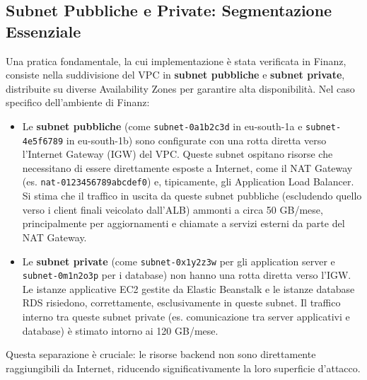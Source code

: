 \subsection{Subnet Pubbliche e Private: Segmentazione Essenziale}
\label{subsec:subnets_cap2}
Una pratica fondamentale, la cui implementazione è stata verificata in Finanz, consiste nella suddivisione del VPC in \textbf{subnet pubbliche} e \textbf{subnet private}, distribuite su diverse Availability Zones per garantire alta disponibilità. Nel caso specifico dell'ambiente di Finanz:
\begin{itemize}
\item Le \textbf{subnet pubbliche} (come \texttt{subnet-0a1b2c3d} in eu-south-1a e \texttt{subnet-4e5f6789} in eu-south-1b) sono configurate con una rotta diretta verso l'Internet Gateway (IGW) del VPC. 
Queste subnet ospitano risorse che necessitano di essere direttamente esposte a Internet, come il NAT Gateway (es. \texttt{nat-0123456789abcdef0}) e, tipicamente, gli Application Load Balancer. 
Si stima che il traffico in uscita da queste subnet pubbliche (escludendo quello verso i client finali veicolato dall'ALB) ammonti a circa 50 GB/mese, principalmente per aggiornamenti e chiamate a servizi esterni da parte del NAT Gateway.
\item Le \textbf{subnet private} (come \texttt{subnet-0x1y2z3w} per gli application server e \texttt{subnet-0m1n2o3p} per i database) non hanno una rotta diretta verso l'IGW. Le istanze applicative EC2 gestite da Elastic Beanstalk e le istanze database RDS risiedono, correttamente, esclusivamente in queste subnet. Il traffico interno tra queste subnet private (es. comunicazione tra server applicativi e database) è stimato intorno ai 120 GB/mese.
\end{itemize}
Questa separazione è cruciale: le risorse backend non sono direttamente raggiungibili da Internet, riducendo significativamente la loro superficie d'attacco.

